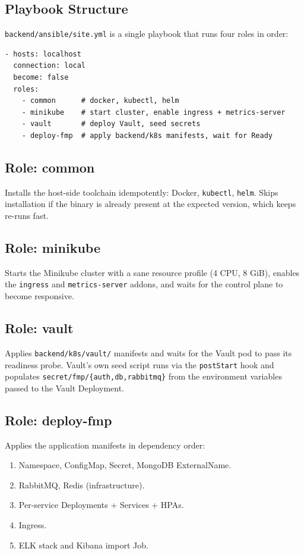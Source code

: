 \documentclass[11pt,a4paper]{article}
\begin{document}
\subsection{Playbook Structure}
\texttt{backend/ansible/site.yml} is a single playbook that runs four
roles in order:

\begin{lstlisting}
- hosts: localhost
  connection: local
  become: false
  roles:
    - common      # docker, kubectl, helm
    - minikube    # start cluster, enable ingress + metrics-server
    - vault       # deploy Vault, seed secrets
    - deploy-fmp  # apply backend/k8s manifests, wait for Ready
\end{lstlisting}

\subsection{Role: common}
Installs the host-side toolchain idempotently: Docker, \texttt{kubectl},
\texttt{helm}.  Skips installation if the binary is already present
at the expected version, which keeps re-runs fast.

\subsection{Role: minikube}
Starts the Minikube cluster with a sane resource profile (4 CPU, 8
GiB), enables the \texttt{ingress} and \texttt{metrics-server}
addons, and waits for the control plane to become responsive.

\subsection{Role: vault}
Applies \texttt{backend/k8s/vault/} manifests and waits for the Vault
pod to pass its readiness probe.  Vault's own seed script runs via
the \texttt{postStart} hook and populates
\texttt{secret/fmp/\{auth,db,rabbitmq\}} from the environment
variables passed to the Vault Deployment.

\subsection{Role: deploy-fmp}
Applies the application manifests in dependency order:

\begin{enumerate}[leftmargin=*]
  \item Namespace, ConfigMap, Secret, MongoDB ExternalName.
  \item RabbitMQ, Redis (infrastructure).
  \item Per-service Deployments + Services + HPAs.
  \item Ingress.
  \item ELK stack and Kibana import Job.
\end{enumerate}
\end{document}
